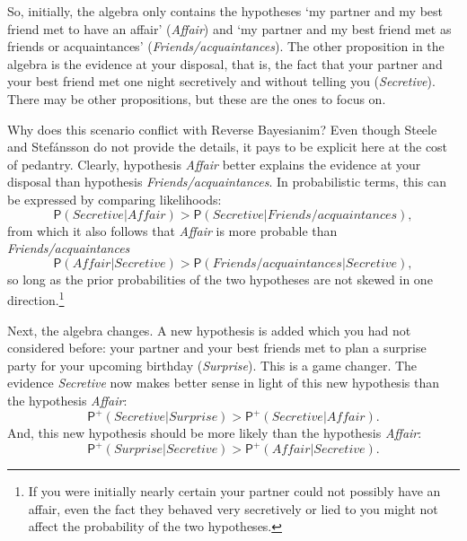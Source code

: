 \documentclass[
  11pt,
  dvipsnames,enabledeprecatedfontcommands]{scrartcl}
\newcommand{\pr}[1]{\ensuremath{\mathsf{P}(#1)}}
\newcommand{\ppr}[2]{\ensuremath{\mathsf{P}^{#1}(#2)}}
\begin{document}
\noindent So, initially, the algebra only contains the hypotheses `my
partner and my best friend met to have an affair' (\textit{Affair}) and
`my partner and my best friend met as friends or acquaintances'
(\textit{Friends/acquaintances}). The other proposition in the algebra
is the evidence at your disposal, that is, the fact that your partner
and your best friend met one night secretively and without telling you
(\textit{Secretive}). There may be other propositions, but these are the
ones to focus on.

Why does this scenario conflict with Reverse Bayesianim? Even though
Steele and Stefánsson do not provide the details, it pays to be explicit
here at the cost of pedantry. Clearly, hypothesis \textit{Affair} better
explains the evidence at your disposal than hypothesis
\textit{Friends/acquaintances}. In probabilistic terms, this can be
expressed by comparing likelihoods:
\[\pr{ \textit{Secretive} \vert \textit{Affair}}> \pr{\textit{Secretive} \vert \textit{Friends/acquaintances}},\]
from which it also follows that \textit{Affair} is more probable than
\textit{Friends/acquaintances}
\[\pr{\textit{Affair} \vert  \textit{Secretive} }> \pr{\textit{Friends/acquaintances} \vert \textit{Secretive}}, \tag{>}\]
so long as the prior probabilities of the two hypotheses are not skewed
in one direction.\footnote{If you were initially nearly certain your
  partner could not possibly have an affair, even the fact they behaved
  very secretively or lied to you might not affect the probability of
  the two hypotheses.}

Next, the algebra changes. A new hypothesis is added which you had not
considered before: your partner and your best friends met to plan a
surprise party for your upcoming birthday (\textit{Surprise}). This is a
game changer. The evidence \textit{Secretive} now makes better sense in
light of this new hypothesis than the hypothesis \textit{Affair}:
\[\ppr{+}{ \textit{Secretive} \vert \textit{Surprise}}> \ppr{+}{\textit{Secretive} \vert \textit{Affair}}.\]
And, this new hypothesis should be more likely than the hypothesis
\textit{Affair}:
\[\ppr{+}{ \textit{Surprise} \vert \textit{Secretive}}> \ppr{+}{ \textit{Affair} \vert \textit{Secretive}}. \tag{*}\]
\end{document}
